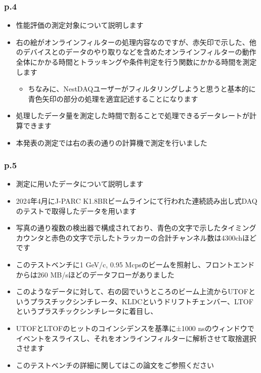 \documentclass[12pt,a4paper,upLaTeX]{jsarticle}
\begin{document}
\subsubsection*{p.4}
\begin{itemize}
\item 性能評価の測定対象について説明します
\item 右の絵がオンラインフィルターの処理内容なのですが、赤矢印で示した、他のデバイスとのデータのやり取りなどを含めたオンラインフィルターの動作全体にかかる時間とトラッキングや条件判定を行う関数にかかる時間を測定します
\begin{itemize}
\item ちなみに、NestDAQユーザーがフィルタリングしようと思うと基本的に青色矢印の部分の処理を適宜記述することになります
\end{itemize}
\item 処理したデータ量を測定した時間で割ることで処理できるデータレートが計算できます
\item 本発表の測定では右の表の通りの計算機で測定を行いました
\end{itemize}

\subsubsection*{p.5}
\begin{itemize}
\item 測定に用いたデータについて説明します
\item 2024年4月にJ-PARC K1.8BRビームラインにて行われた連続読み出し式DAQのテストで取得したデータを用います
\item 写真の通り複数の検出器で構成されており、青色の文字で示したタイミングカウンタと赤色の文字で示したトラッカーの合計チャンネル数は4300chほどです
\item このテストベンチに1 GeV/c, 0.95 Mcpsのビームを照射し、フロントエンドからは260 MB/sほどのデータフローがありました
\item このようなデータに対して、右の図でいうところのビーム上流からUTOFというプラスチックシンチレータ、KLDCというドリフトチェンバー、LTOFというプラスチックシンチレータに着目し、
\item UTOFとLTOFのヒットのコインシデンスを基準に±1000 nsのウィンドウでイベントをスライスし、それをオンラインフィルターに解析させて取捨選択させます
\item このテストベンチの詳細に関してはこの論文をご参照ください
\end{itemize}
\end{document}
